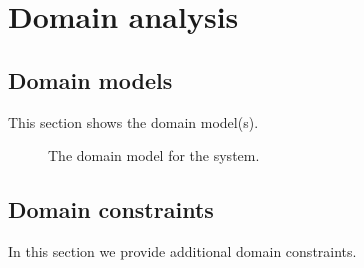 \documentclass[english]{sareport}
\begin{document}
\maketitle

\tableofcontents

\chapter{Domain analysis}\label{sec:domain}
\section{Domain models}
This section shows the domain model(s).

\begin{figure}[!htp]
    \centering
    \caption{The domain model for the system.}\label{fig:domain_model}
\end{figure}

\section{Domain constraints}
In this section we provide additional domain constraints.
\end{document}
